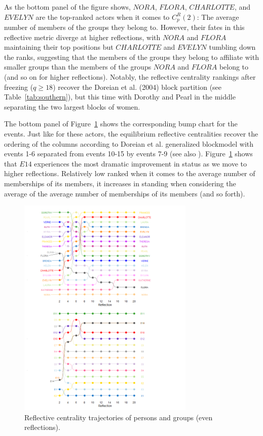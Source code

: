 \documentclass[a4paper,fleqn]{cas-sc}
\begin{document}
As the bottom panel of the figure shows, $NORA$, $FLORA$, $CHARLOTTE$, and $EVELYN$ are the top-ranked actors when it comes to $C^R_p(2)$:  The average number of members of the groups they belong to. However, their fates in this reflective metric diverge at higher reflections, with $NORA$ and $FLORA$ maintaining their top positions but $CHARLOTTE$ and $EVELYN$ tumbling down the ranks, suggesting that the members of the groups they belong to affiliate with smaller groups than the members of the groups $NORA$ and $FLORA$ belong to (and so on for higher reflections). Notably, the reflective centrality rankings after freezing ($q \geq 18$) recover the Doreian et al. (2004) block partition (see Table~\ref{tab:southern}), but this time with Dorothy and Pearl in the middle separating the two largest blocks of women. 

The bottom panel of Figure~\ref{fig:pg-reflections} shows the corresponding bump chart for the events. Just like for these actors, the equilibrium reflective centralities recover the ordering of the columns according to Doreian et al. generalized blockmodel with events 1-6 separated from events 10-15 by events 7-9 (see also \citet{kovacs2010generalized}). Figure~\ref{fig:pg-reflections} shows that $E14$ experiences the most dramatic improvement in status as we move to higher reflections. Relatively low ranked when it comes to the average number of memberships of its members, it increases in standing when considering the average of the average number of memberships of its members (and so forth). 

\begin{figure}
    \centering
    \includegraphics[width=0.75\textwidth]{Plots/pg-reflections.jpg}
    \caption{Reflective centrality trajectories of persons and groups (even reflections).}
    \label{fig:pg-reflections}
\end{figure}
\end{document}
